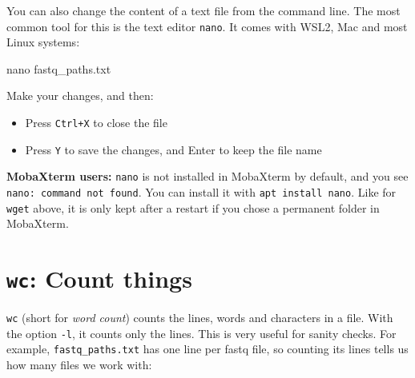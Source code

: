 \documentclass[
  letterpaper,
  DIV=11,
  numbers=noendperiod]{scrreprt}
\newenvironment{Shaded}{}{}
\newcommand{\FunctionTok}[1]{\textcolor[rgb]{0.44,0.26,0.76}{#1}}
\newcommand{\NormalTok}[1]{\textcolor[rgb]{0.14,0.16,0.18}{#1}}
\providecommand{\tightlist}{%
  \setlength{\itemsep}{0pt}\setlength{\parskip}{0pt}}
\begin{document}
\begin{tcolorbox}[enhanced jigsaw, coltitle=black, breakable, titlerule=0mm, colback=white, rightrule=.15mm, bottomrule=.15mm, toprule=.15mm, colframe=quarto-callout-tip-color-frame, colbacktitle=quarto-callout-tip-color!10!white, bottomtitle=1mm, opacitybacktitle=0.6, toptitle=1mm, leftrule=.75mm, arc=.35mm, title=\textcolor{quarto-callout-tip-color}{\faLightbulb}\hspace{0.5em}{Tip: Editing text files with \texttt{nano} (optional)}, left=2mm, opacityback=0]

You can also change the content of a text file from the command line.
The most common tool for this is the text editor \texttt{nano}. It comes
with WSL2, Mac and most Linux systems:

\begin{Shaded}
\begin{Highlighting}[]
\FunctionTok{nano}\NormalTok{ fastq\_paths.txt}
\end{Highlighting}
\end{Shaded}

Make your changes, and then:

\begin{itemize}
\tightlist
\item
  Press \texttt{Ctrl+X} to close the file
\item
  Press \texttt{Y} to save the changes, and Enter to keep the file name
\end{itemize}

\textbf{MobaXterm users:} \texttt{nano} is not installed in MobaXterm by
default, and you see \texttt{nano:\ command\ not\ found}. You can
install it with \texttt{apt\ install\ nano}. Like for \texttt{wget}
above, it is only kept after a restart if you chose a permanent folder
in MobaXterm.

\end{tcolorbox}

\section{\texorpdfstring{\texttt{wc}: Count
things}{wc: Count things}}\label{wc-count-things}

\texttt{wc} (short for \emph{word count}) counts the lines, words and
characters in a file. With the option \texttt{-l}, it counts only the
lines. This is very useful for sanity checks. For example,
\texttt{fastq\_paths.txt} has one line per fastq file, so counting its
lines tells us how many files we work with:
\end{document}
